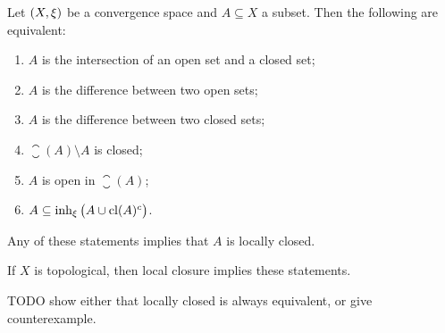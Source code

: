 \begin{proposition} \label{locallyClosedEquivalents}
Let $\sSet{X,\xi}$ be a convergence space and $A\subseteq X$ a subset. Then the following are equivalent:
\begin{enumerate}
\item $A$ is the intersection of an open set and a closed set;
\item $A$ is the difference between two open sets;
\item $A$ is the difference between two closed sets;
\item $\closure(A)\setminus A$ is closed;
\item $A$ is open in $\closure(A)$;
\item $A \subseteq \operatorname{inh}_\xi\big(A\cup \operatorname{cl}(A)^c\big)$.
\end{enumerate}
Any of these statements implies that $A$ is locally closed.

If $X$ is topological, then local closure implies these statements.
\end{proposition}
TODO show either that locally closed is always equivalent, or give counterexample.
